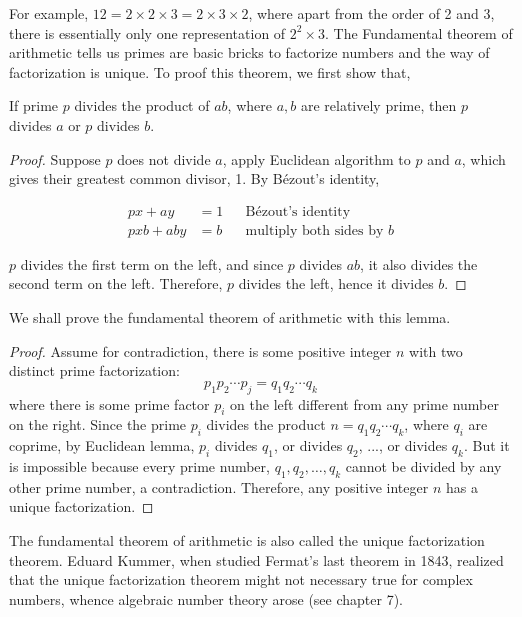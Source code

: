 \documentclass[b5paper]{article}
\begin{document}
For example, $12 = 2 \times 2 \times 3 = 2 \times 3 \times 2$, where apart from the order of 2 and 3, there is essentially only one representation of $2^2 \times 3$. The Fundamental theorem of arithmetic tells us primes are basic bricks to factorize numbers and the way of factorization is unique. To proof this theorem, we first show that,

\begin{lemma}[Euclid]
If prime $p$ divides the product of $ab$, where $a, b$ are relatively prime, then $p$ divides $a$ or $p$ divides $b$.
\end{lemma}

\begin{proof}
Suppose $p$ does not divide $a$, apply Euclidean algorithm to $p$ and $a$, which gives their greatest common divisor, 1. By Bézout's identity,

\begin{align*}
px + ay &= 1 && \text{Bézout's identity} \\
pxb + aby & = b && \text{multiply both sides by }b
\end{align*}

$p$ divides the first term on the left, and since $p$ divides $ab$, it also divides the second term on the left. Therefore, $p$ divides the left, hence it divides $b$.
\end{proof}

We shall prove the fundamental theorem of arithmetic with this lemma.

\begin{proof}
Assume for contradiction, there is some positive integer $n$ with two distinct prime factorization:
\[
p_1 p_2 \dotsm p_j = q_1 q_2 \dotsm q_k
\]
where there is some prime factor $p_i$ on the left different from any prime number on the right. Since the prime $p_i$ divides the product $n = q_1 q_2 \dotsm q_k$, where $q_i$ are coprime, by Euclidean lemma, $p_i$ divides $q_1$, or divides $q_2$, ..., or divides $q_k$. But it is impossible because every prime number, $q_1, q_2, \dotsc, q_k$ cannot be divided by any other prime number, a contradiction. Therefore, any positive integer $n$ has a unique factorization.
\end{proof}

The fundamental theorem of arithmetic is also called the unique factorization theorem. Eduard Kummer, when studied Fermat's last theorem in 1843, realized that the unique factorization theorem might not necessary true for complex numbers, whence algebraic number theory arose (see chapter 7).
\end{document}
